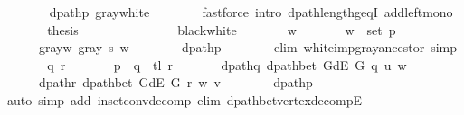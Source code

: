\begin{isabellebody}
\ \ \ \ \ \ \isamarkupfalse%
\ dpath{\isacharunderscore}{\kern0pt}p\ gray{\isacharunderscore}{\kern0pt}white\isanewline
\ \ \ \ \ \ \isamarkupfalse%
\ {\isacharparenleft}{\kern0pt}fastforce\ intro{\isacharcolon}{\kern0pt}\ dpath{\isacharunderscore}{\kern0pt}length{\isacharunderscore}{\kern0pt}geq{\isacharunderscore}{\kern0pt}{}I\ add{\isacharunderscore}{\kern0pt}left{\isacharunderscore}{\kern0pt}mono{\isacharparenright}{\kern0pt}\isanewline
\ \ \ \ \isamarkupfalse%
\ \isamarkupfalse%
\ {\isacharquery}{\kern0pt}thesis\isanewline
\ \ \ \ \ \ \isacommand{{\isachardot}{\kern0pt}}\isamarkupfalse%
\isanewline
\ \ \isamarkupfalse%
\isanewline
\ \ \ \ \isamarkupfalse%
\ black{\isacharunderscore}{\kern0pt}white\isanewline
\ \ \ \ \isamarkupfalse%
\ \isamarkupfalse%
\ w\ \isanewline
\ \ \ \ \ \ {\isachardoublequoteopen}w\ {\isasymin}\ set\ p{\isachardoublequoteclose}\ \isanewline
\ \ \ \ \ \ gray{\isacharunderscore}{\kern0pt}w{\isacharcolon}{\kern0pt}\ {\isachardoublequoteopen}gray\ s\ w{\isachardoublequoteclose}\isanewline
\ \ \ \ \ \ \isamarkupfalse%
\ dpath{\isacharunderscore}{\kern0pt}p\isanewline
\ \ \ \ \ \ \isamarkupfalse%
\ {\isacharparenleft}{\kern0pt}elim\ white{\isacharunderscore}{\kern0pt}imp{\isacharunderscore}{\kern0pt}gray{\isacharunderscore}{\kern0pt}ancestor{\isacharparenright}{\kern0pt}\ simp{\isacharplus}{\kern0pt}\isanewline
\ \ \ \ \isamarkupfalse%
\ \isamarkupfalse%
\ q\ r\ \isanewline
\ \ \ \ \ \ {\isachardoublequoteopen}p\ {\isacharequal}{\kern0pt}\ q\ {\isacharat}{\kern0pt}\ tl\ r{\isachardoublequoteclose}\ \isanewline
\ \ \ \ \ \ dpath{\isacharunderscore}{\kern0pt}q{\isacharcolon}{\kern0pt}\ {\isachardoublequoteopen}dpath{\isacharunderscore}{\kern0pt}bet\ {\isacharparenleft}{\kern0pt}G{\isachardot}{\kern0pt}dE\ G{\isacharparenright}{\kern0pt}\ q\ u\ w{\isachardoublequoteclose}\ \isanewline
\ \ \ \ \ \ dpath{\isacharunderscore}{\kern0pt}r{\isacharcolon}{\kern0pt}\ {\isachardoublequoteopen}dpath{\isacharunderscore}{\kern0pt}bet\ {\isacharparenleft}{\kern0pt}G{\isachardot}{\kern0pt}dE\ G{\isacharparenright}{\kern0pt}\ r\ w\ v{\isachardoublequoteclose}\isanewline
\ \ \ \ \ \ \isamarkupfalse%
\ dpath{\isacharunderscore}{\kern0pt}p\isanewline
\ \ \ \ \ \ \isamarkupfalse%
\ {\isacharparenleft}{\kern0pt}auto\ simp\ add{\isacharcolon}{\kern0pt}\ in{\isacharunderscore}{\kern0pt}set{\isacharunderscore}{\kern0pt}conv{\isacharunderscore}{\kern0pt}decomp\ elim{\isacharcolon}{\kern0pt}\ dpath{\isacharunderscore}{\kern0pt}bet{\isacharunderscore}{\kern0pt}vertex{\isacharunderscore}{\kern0pt}decompE{\isacharparenright}{\kern0pt}\isanewline

\end{isabellebody}
